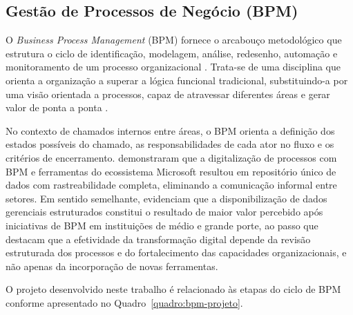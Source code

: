 \subsection{Gestão de Processos de Negócio (BPM)}

O \textit{Business Process Management} (BPM) fornece o
arcabouço metodológico que estrutura o ciclo de
identificação, modelagem, análise, redesenho, automação e
monitoramento de um processo organizacional
\cite{Ramos2024}. Trata-se de uma disciplina que orienta a
organização a superar a lógica funcional tradicional,
substituindo-a por uma visão orientada a processos, capaz de
atravessar diferentes áreas e gerar valor de ponta a ponta
\cite{SantosCaldeiraPacheco2026}.

No contexto de chamados internos entre áreas, o BPM orienta a
definição dos estados possíveis do chamado, as
responsabilidades de cada ator no fluxo e os critérios de
encerramento. \cite{Lopes2024} demonstraram que a
digitalização de processos com BPM e ferramentas do
ecossistema Microsoft resultou em repositório único de dados
com rastreabilidade completa, eliminando a comunicação
informal entre setores. Em sentido semelhante,
\cite{Ramos2024} evidenciam que a disponibilização de dados
gerenciais estruturados constitui o resultado de maior valor
percebido após iniciativas de BPM em instituições de médio e
grande porte, ao passo que
\cite{SantosCaldeiraPacheco2026} destacam que a efetividade
da transformação digital depende da revisão estruturada dos
processos e do fortalecimento das capacidades
organizacionais, e não apenas da incorporação de novas
ferramentas.

O projeto desenvolvido neste trabalho é relacionado às
etapas do ciclo de BPM conforme apresentado no
Quadro~\ref{quadro:bpm-projeto}.

